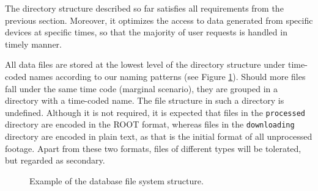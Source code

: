 The directory structure described so far satisfies all requirements from the previous section. Moreover, it optimizes the access to data generated from specific devices at specific times, so that the majority of user requests is handled in timely manner.

All data files are stored at the lowest level of the directory structure under time-coded names according to our naming patterns (see Figure \ref{fig:db-structure}). Should more files fall under the same time code (marginal scenario), they are grouped in a directory with a time-coded name. The file structure in such a directory is undefined. Although it is not required, it is expected that files in the \texttt{processed} directory are encoded in the ROOT format, whereas files in the \texttt{downloading} directory are encoded in plain text, as that is the initial format of all unprocessed footage. Apart from these two formats, files of different types will be tolerated, but regarded as secondary.

\begin{figure}[t]
\begin{center}


\caption{Example of the database file system structure.}
\label{fig:db-structure}
\end{center}
\end{figure}


